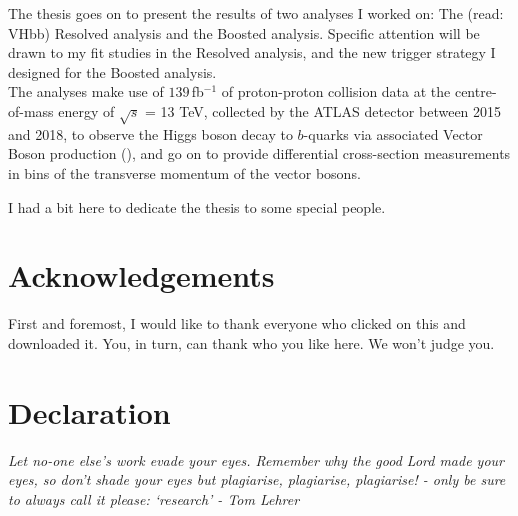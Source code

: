 \documentclass[12pt,titlepage,oneside]{book}
\newcommand{\tit}[1]{\textit{#1}} %
\newcommand{\Ra}{Resolved analysis }
\newcommand{\ra}{Resolved analysis}
\newcommand{\ba}{Boosted analysis}
\newcommand{\bo}{$b$}
\newcommand{\lumi}{\ensuremath{139}\,fb\ensuremath{^{-1}} }             %
\begin{document}
The thesis goes on to present the results of two analyses I worked on: The \VHbb (read: VHbb) \Ra and the \VHbb \ba. Specific attention will be drawn to my fit studies in the \ra, and the new trigger strategy I designed for the \ba. \\

The analyses make use of \lumi of proton-proton collision data at the centre-of-mass energy of $\sqrt{s}$ = 13 TeV, collected by the ATLAS detector between 2015 and 2018, to observe the Higgs boson decay to \bo-quarks via associated Vector Boson production (\VHbbo), and go on to provide differential cross-section measurements in bins of the transverse momentum of the vector bosons.\\


\newpage
\clearpage
\begin{center}
    \thispagestyle{empty}
    \vspace*{\fill}
    \begin{flushleft}
    I had a bit here to dedicate the thesis to some special people.
    \end{flushleft}
    \vspace*{\fill}
\end{center}
\clearpage


\chapter{Acknowledgements}
\doublespacing

First and foremost, I would like to thank everyone who clicked on this and downloaded it. You, in turn, can thank who you like here. We won't judge you.\\

\singlespacing

\tableofcontents
\cleardoublepage

{}
\listoffigures
\cleardoublepage

{}
\listoftables

\chapter{Declaration}
\tit{Let no-one else's work evade your eyes. Remember why the good Lord made your eyes, so don't shade your eyes but plagiarise, plagiarise, plagiarise! - only be sure to always call it please: `research' - Tom Lehrer}\\
\end{document}

